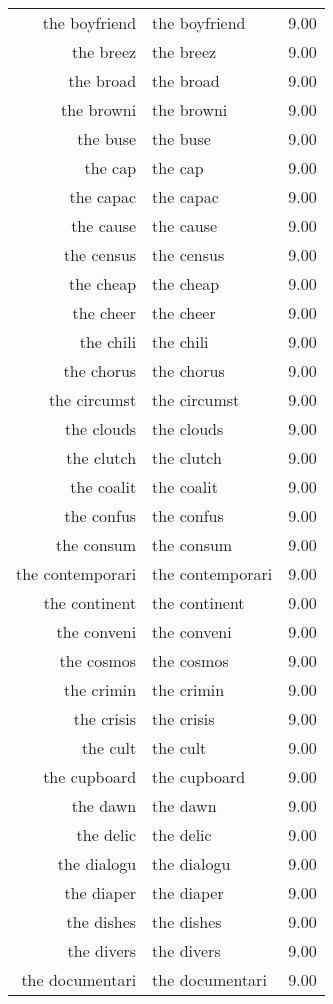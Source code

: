 \begin{table}[ht]
\begin{tabular}{rlr}
  the boyfriend & the boyfriend & 9.00 \\ 
  the breez & the breez & 9.00 \\ 
  the broad & the broad & 9.00 \\ 
  the browni & the browni & 9.00 \\ 
  the buse & the buse & 9.00 \\ 
  the cap & the cap & 9.00 \\ 
  the capac & the capac & 9.00 \\ 
  the cause & the cause & 9.00 \\ 
  the census & the census & 9.00 \\ 
  the cheap & the cheap & 9.00 \\ 
  the cheer & the cheer & 9.00 \\ 
  the chili & the chili & 9.00 \\ 
  the chorus & the chorus & 9.00 \\ 
  the circumst & the circumst & 9.00 \\ 
  the clouds & the clouds & 9.00 \\ 
  the clutch & the clutch & 9.00 \\ 
  the coalit & the coalit & 9.00 \\ 
  the confus & the confus & 9.00 \\ 
  the consum & the consum & 9.00 \\ 
  the contemporari & the contemporari & 9.00 \\ 
  the continent & the continent & 9.00 \\ 
  the conveni & the conveni & 9.00 \\ 
  the cosmos & the cosmos & 9.00 \\ 
  the crimin & the crimin & 9.00 \\ 
  the crisis & the crisis & 9.00 \\ 
  the cult & the cult & 9.00 \\ 
  the cupboard & the cupboard & 9.00 \\ 
  the dawn & the dawn & 9.00 \\ 
  the delic & the delic & 9.00 \\ 
  the dialogu & the dialogu & 9.00 \\ 
  the diaper & the diaper & 9.00 \\ 
  the dishes & the dishes & 9.00 \\ 
  the divers & the divers & 9.00 \\ 
  the documentari & the documentari & 9.00 \\ 

\end{tabular}
\end{table}
